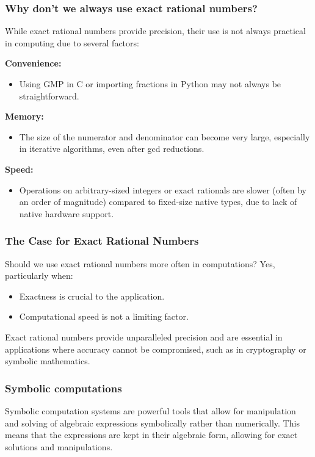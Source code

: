 \documentclass[12pt]{article}
\begin{document}
\subsubsection{Why don't we always use exact rational numbers?}
While exact rational numbers provide precision, their use is not always practical in computing due to several factors:

\textbf{Convenience:}
\begin{itemize}
    \item Using GMP in C or importing fractions in Python may not always be straightforward.
\end{itemize}

\textbf{Memory:}
\begin{itemize}
    \item The size of the numerator and denominator can become very large, especially in iterative algorithms, even after gcd reductions.
\end{itemize}

\textbf{Speed:}
\begin{itemize}
    \item Operations on arbitrary-sized integers or exact rationals are slower (often by an order of magnitude) compared to fixed-size native types, due to lack of native hardware support.
\end{itemize}

\subsubsection{The Case for Exact Rational Numbers}
Should we use exact rational numbers more often in computations? Yes, particularly when:
\begin{itemize}
    \item Exactness is crucial to the application.
    \item Computational speed is not a limiting factor.
\end{itemize}

Exact rational numbers provide unparalleled precision and are essential in applications where accuracy cannot be compromised, such as in cryptography or symbolic mathematics.

\subsubsection{Symbolic computations}
Symbolic computation systems are powerful tools that allow for manipulation and solving of algebraic expressions symbolically rather than numerically. This means that the expressions are kept in their algebraic form, allowing for exact solutions and manipulations.\\
\end{document}
